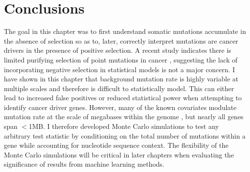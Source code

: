 \section{Conclusions}

The goal in this chapter was to first understand  somatic mutations accumulate in the absence of selection so as to, later, correctly interpret  mutations are cancer drivers in the presence of positive selection. A recent study indicates there is limited purifying selection of point mutations in cancer \cite{RN56}, suggesting the lack of incorporating negative selection in statistical models is not a major concern. I have shown in this chapter that background mutation rate is highly variable at multiple scales and therefore is difficult to statistically model. This can either lead to increased false positives or reduced statistical power when attempting to identify cancer driver genes. However, many of the known covariates modulate mutation rate at the scale of megabases within the genome \cite{RN74}, but nearly all genes span $<$1MB. I therefore developed Monte Carlo simulations to test any arbitrary test statistic by conditioning on the total number of mutations within a gene while accounting for nucleotide sequence context. The flexibility of the Monte Carlo simulations will be critical in later chapters when evaluating the significance of results from machine learning methods. 